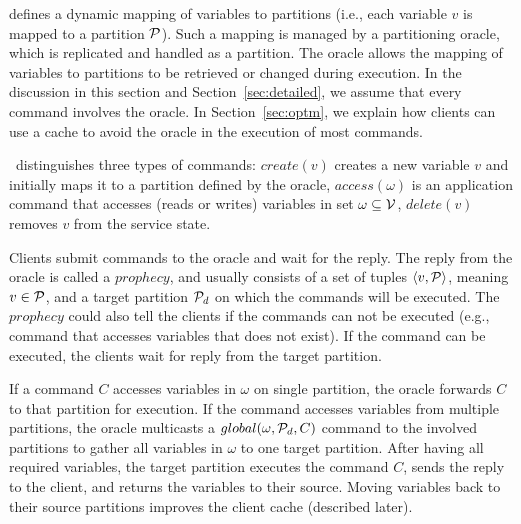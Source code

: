 \dynastar defines a dynamic mapping of variables to partitions (i.e., each variable $v$ is mapped to a partition $\mathcal{P}$).
Such a mapping is managed by a partitioning oracle, which is replicated and handled as a partition.
The oracle allows the mapping of variables to partitions to be retrieved or changed during execution.
In the discussion in this section and Section~\ref{sec:detailed}, we assume that every command involves the oracle.
In Section~\ref{sec:optm}, we explain how clients can use a cache to avoid the oracle in the execution of most commands.

\dynastar\ distinguishes three types of commands:
$create(v)$ creates a new variable $v$ and initially maps it to a partition defined by the oracle,
$access(\omega)$ is an application command that accesses (reads or writes) variables in set $\omega \subseteq \mathcal{V}$,
$delete(v)$ removes $v$ from the service state.



Clients submit commands to the oracle and wait for the reply. 
The reply from the oracle is called a $prophecy$, and usually 
consists of a set of tuples $\langle v, \mathcal{P} \rangle$, meaning 
$v \in \mathcal{P}$, and a target partition $\mathcal{P}_d$ on which the commands 
will be executed. The $prophecy$ could also tell the clients 
if the commands can not be executed (e.g., command that accesses 
variables that does not exist). If the command can be executed, 
the clients wait for reply from the target partition.

If a command $C$ accesses variables in $\omega$ on single partition, 
the oracle forwards $C$ to that partition for execution. If the command 
accesses variables from multiple partitions, the oracle multicasts a 
$global(\omega,\mathcal{P}_d, C)$ command to the involved partitions to gather 
all variables in $\omega$ to one target partition. After having all 
required variables, the target partition executes the command $C$, 
sends the reply to the client, and returns the variables to their source. 
Moving variables back to their source partitions improves the client cache (described later).


